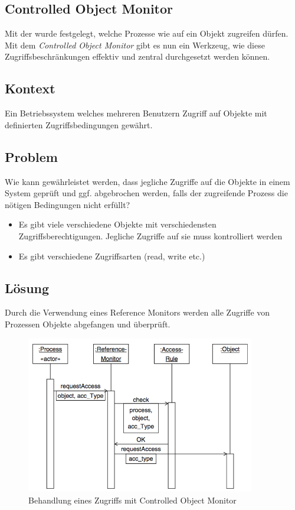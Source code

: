 \subsection{Controlled Object Monitor}
Mit der  wurde festgelegt, welche Prozesse wie auf ein Objekt zugreifen dürfen. Mit dem \emph{Controlled Object Monitor} gibt es nun ein Werkzeug, wie diese Zugriffsbeschränkungen effektiv und zentral durchgesetzt werden können.

\subsection*{Kontext}
Ein Betriebssystem welches mehreren Benutzern Zugriff auf Objekte mit definierten Zugriffsbedingungen gewährt.

\subsection*{Problem}
Wie kann gewährleistet werden, dass jegliche Zugriffe auf die Objekte in einem System geprüft und ggf. abgebrochen werden, falls der zugreifende Prozess die nötigen Bedingungen nicht erfüllt?

\begin{itemize}
	\item Es gibt viele verschiedene Objekte mit verschiedensten Zugriffsberechtigungen. Jegliche Zugriffe auf sie muss kontrolliert werden
	\item Es gibt verschiedene Zugriffsarten (read, write etc.)
\end{itemize}


\subsection*{Lösung}
Durch die Verwendung eines Reference Monitors werden alle Zugriffe von Prozessen Objekte abgefangen und überprüft.

\begin{figure}[H]
	\centering
	\includegraphics[width=10cm]{content/security/operating-system-access-control/images/controlled-object-monitor.png}
	\caption{Behandlung eines Zugriffs mit Controlled Object Monitor \cite{SecPatterns06}}
\end{figure}


